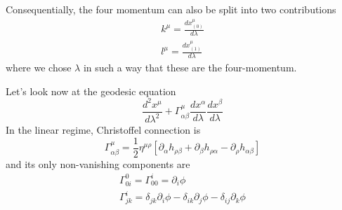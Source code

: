 Consequentially, the four momentum can also be split into two contributions
\begin{gather*}
k^{\mu } = \frac{d x^{\mu }_{\left( 0 \right)}}{d \lambda } \\
l^{\mu } = \frac{d x^{\mu }_{\left( 1 \right)}}{d \lambda }
\end{gather*}
where we chose $\lambda $ in such a way that these are the four-momentum.\par
Let's look now at the geodesic equation
\[
\frac{d ^{2}x^{\mu }}{d \lambda ^{2} } + \Gamma ^{\mu }_{\alpha \beta } \frac{d x^{\alpha }}{d \lambda }\frac{d x^{\beta }}{d \lambda }
\]
In the linear regime, Christoffel connection is
\[
\Gamma ^{\mu }_{\alpha \beta } = \frac{1}{2}\eta ^{\mu \rho }\left[ \partial_{\alpha }h_{\rho \beta }+ \partial_{\beta }h_{\rho \alpha } - \partial_{\rho }h_{\alpha \beta } \right]
\]
and its only non-vanishing components are
\begin{gather*}
\Gamma ^{0}_{0i} = \Gamma ^{i}_{00} = \partial_{i}\phi  \\
\Gamma ^{i}_{jk} = \delta _{jk}\partial_{i}\phi - \delta _{ik}\partial_{j} \phi - \delta _{ij}\partial_{k}\phi  
\end{gather*}















